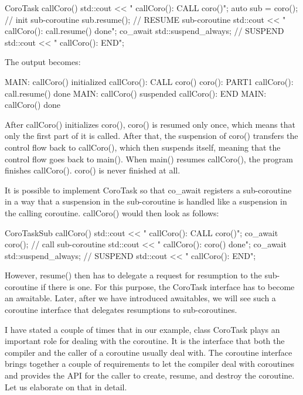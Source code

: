 \begin{cpp}
CoroTask callCoro()
{
	std::cout << " callCoro(): CALL coro()\n";
	auto sub = coro(); // init sub-coroutine
	sub.resume(); // RESUME sub-coroutine
	std::cout << " callCoro(): call.resume() done\n";
	co_await std::suspend_always{}; // SUSPEND
	std::cout << " callCoro(): END\n";
}
\end{cpp}

The output becomes:

\begin{shell}
MAIN: callCoro() initialized
  callCoro(): CALL coro()
    coro(): PART1
  callCoro(): call.resume() done
MAIN: callCoro() suspended
  callCoro(): END
MAIN: callCoro() done
\end{shell}

After callCoro() initializes coro(), coro() is resumed only once, which means that only the first part of it is called. After that, the suspension of coro() transfers the control flow back to callCoro(), which then suspends itself, meaning that the control flow goes back to main(). When main() resumes callCoro(), the program finishes callCoro(). coro() is never finished at all.


It is possible to implement CoroTask so that co\_await registers a sub-coroutine in a way that a suspension in the sub-coroutine is handled like a suspension in the calling coroutine. callCoro() would then look as follows:

\begin{cpp}
CoroTaskSub callCoro()
{
	std::cout << " callCoro(): CALL coro()\n";
	co_await coro(); // call sub-coroutine
	std::cout << " callCoro(): coro() done\n";
	co_await std::suspend_always{}; // SUSPEND
	std::cout << " callCoro(): END\n";
}
\end{cpp}

However, resume() then has to delegate a request for resumption to the sub-coroutine if there is one. For this purpose, the CoroTask interface has to become an awaitable. Later, after we have introduced awaitables, we will see such a coroutine interface that delegates resumptions to sub-coroutines.


I have stated a couple of times that in our example, class CoroTask plays an important role for dealing with the coroutine. It is the interface that both the compiler and the caller of a coroutine usually deal with. The coroutine interface brings together a couple of requirements to let the compiler deal with coroutines and provides the API for the caller to create, resume, and destroy the coroutine. Let us elaborate on that in detail.

